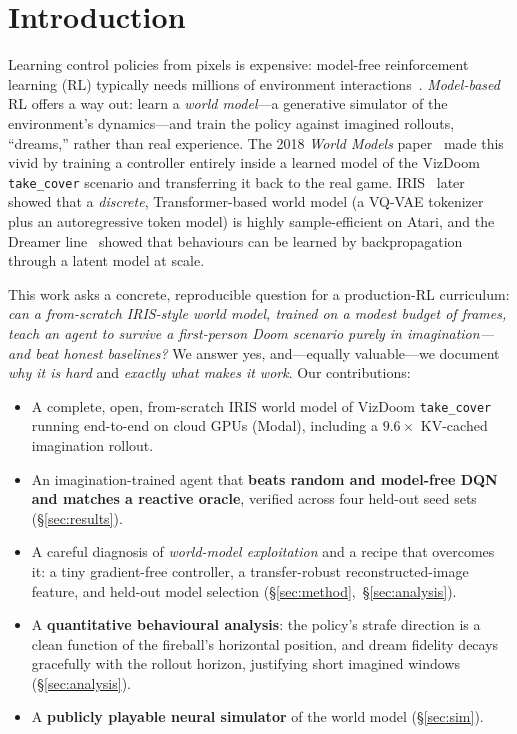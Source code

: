 \documentclass[11pt]{article}
\begin{document}
\section{Introduction}
Learning control policies from pixels is expensive: model-free reinforcement learning (RL)
typically needs millions of environment interactions~\cite{mnih2015}. \emph{Model-based} RL
offers a way out: learn a \emph{world model}---a generative simulator of the environment's
dynamics---and train the policy against imagined rollouts, ``dreams,'' rather than real
experience. The 2018 \emph{World Models} paper~\cite{ha2018} made this vivid by training a
controller entirely inside a learned model of the VizDoom \texttt{take\_cover} scenario and
transferring it back to the real game. IRIS~\cite{micheli2023} later showed that a
\emph{discrete}, Transformer-based world model (a VQ-VAE tokenizer~\cite{oord2017} plus an
autoregressive token model) is highly sample-efficient on Atari, and the Dreamer
line~\cite{hafner2020,hafner2021,hafner2023} showed that behaviours can be learned by
backpropagation through a latent model at scale.

This work asks a concrete, reproducible question for a production-RL curriculum: \emph{can a
from-scratch IRIS-style world model, trained on a modest budget of frames, teach an agent to
survive a first-person Doom scenario purely in imagination---and beat honest baselines?}
We answer yes, and---equally valuable---we document \emph{why it is hard} and \emph{exactly what
makes it work}. Our contributions:
\begin{itemize}\itemsep2pt
\item A complete, open, from-scratch IRIS world model of VizDoom \texttt{take\_cover} running
end-to-end on cloud GPUs (Modal), including a $9.6\times$ KV-cached imagination rollout.
\item An imagination-trained agent that \textbf{beats random and model-free DQN and matches a
reactive oracle}, verified across four held-out seed sets (\S\ref{sec:results}).
\item A careful diagnosis of \emph{world-model exploitation} and a recipe that overcomes it:
a tiny gradient-free controller, a transfer-robust reconstructed-image feature, and held-out
model selection (\S\ref{sec:method},~\S\ref{sec:analysis}).
\item A \textbf{quantitative behavioural analysis}: the policy's strafe direction is a clean
function of the fireball's horizontal position, and dream fidelity decays gracefully with the
rollout horizon, justifying short imagined windows (\S\ref{sec:analysis}).
\item A \textbf{publicly playable neural simulator} of the world model (\S\ref{sec:sim}).
\end{itemize}
\end{document}

